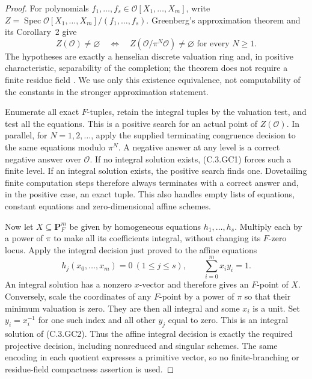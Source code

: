 \begin{proof}
For polynomials $f_1,\ldots,f_s\in\mathcal O[X_1,\ldots,X_m]$,
write $Z=\operatorname{Spec}\mathcal O[X_1,\ldots,X_m]/(f_1,\ldots,f_s)$.
Greenberg's approximation theorem and its Corollary~2 give
\[
 Z(\mathcal O)\ne\varnothing
 \quad\Longleftrightarrow\quad
 Z(\mathcal O/\pi^N\mathcal O)\ne\varnothing
       \text{ for every }N\ge1 .                    \tag{C.3.GC1}
\]
The hypotheses are exactly a henselian discrete valuation ring
and, in positive characteristic, separability of the completion;
the theorem does not require a finite residue field
\cite[Theorem 1 and Corollary 2, p.\ 59, with proof pp.\ 60--64]
{C-Greenberg1966}.  We use only this existence equivalence, not
computability of the constants in the stronger approximation statement.

Enumerate all exact $F$-tuples, retain the integral tuples by the
valuation test, and test all the equations.  This is a positive
search for an actual point of $Z(\mathcal O)$.
In parallel, for $N=1,2,\ldots$, apply the supplied terminating
congruence decision to the same equations modulo $\pi^N$.
A negative answer at any level is a correct negative answer over
$\mathcal O$.  If no integral solution exists, (C.3.GC1) forces
such a finite level.  If an integral solution exists, the positive
search finds one.  Dovetailing finite computation steps therefore
always terminates with a correct answer and, in the positive case,
an exact tuple.  This also handles empty lists of equations,
constant equations and zero-dimensional affine schemes.

Now let $X\subseteq\mathbf P_F^m$ be given by homogeneous equations
$h_1,\ldots,h_s$.  Multiply each by a power of $\pi$ to make all
its coefficients integral, without changing its $F$-zero locus.
Apply the integral decision just proved to the affine equations
\[
 h_j(x_0,\ldots,x_m)=0\ (1\le j\le s),
 \qquad \sum_{i=0}^m x_i y_i=1.                     \tag{C.3.GC2}
\]
An integral solution has a nonzero $x$-vector and therefore gives
an $F$-point of $X$.  Conversely, scale the coordinates of any
$F$-point by a power of $\pi$ so that their minimum valuation is
zero.  They are then all integral and some $x_i$ is a unit.
Set $y_i=x_i^{-1}$ for one such index and all other $y_j$ equal
to zero.  This is an integral solution of (C.3.GC2).
Thus the affine integral decision is exactly the required projective
decision, including nonreduced and singular schemes.  The same
encoding in each quotient expresses a primitive vector, so no
finite-branching or residue-field compactness assertion is used.


\end{proof}
